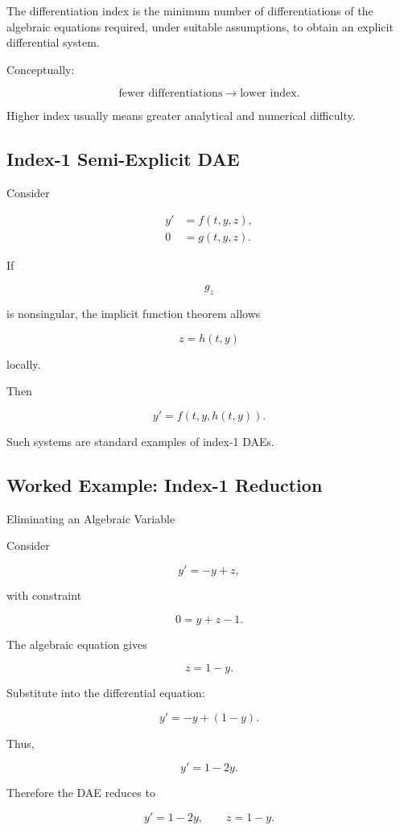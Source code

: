 The differentiation index is the minimum number of differentiations of
the algebraic equations required, under suitable assumptions, to obtain
an explicit differential system.

Conceptually:

\[
\boxed{
\text{fewer differentiations}
\rightarrow
\text{lower index}.
}
\]

Higher index usually means greater analytical and numerical difficulty.

\subsection{Index-1 Semi-Explicit DAE}
\label{subsec:index-one-dae}

Consider

\[
\begin{aligned}
y'
&=
f(t,y,z),
\\
0
&=
g(t,y,z).
\end{aligned}
\]

If

\[
\boxed{
g_z
}
\]

is nonsingular, the implicit function theorem allows

\[
\boxed{
z=h(t,y)
}
\]

locally.

Then

\[
\boxed{
y'
=
f
(
t,y,h(t,y)
).
}
\]

Such systems are standard examples of index-1 DAEs.

\subsection{Worked Example: Index-1 Reduction}
\label{subsec:worked-index-one-reduction}

\begin{workedexamplebox}{Eliminating an Algebraic Variable}

Consider

\[
y'
=
-y+z,
\]

with constraint

\[
0=y+z-1.
\]

The algebraic equation gives

\[
z=1-y.
\]

Substitute into the differential equation:

\[
y'
=
-y+(1-y).
\]

Thus,

\[
y'
=
1-2y.
\]

Therefore the DAE reduces to

\begin{answerbox}
\[
\boxed{
y'
=
1-2y,
\qquad
z=1-y.
}
\]
\end{answerbox}

\end{workedexamplebox}

